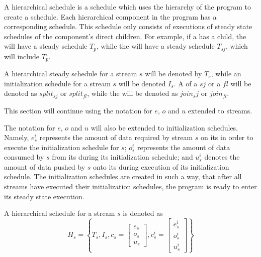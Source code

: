 A hierarchical schedule is a schedule which uses the hierarchy of
the program to create a schedule. Each hierarchical component in
the program has a corresponding schedule. This schedule only
consists of executions of steady state schedules of the
component's direct children. For example, if a \splitjoin has a
\pipeline child, the \pipeline will have a steady schedule $T_p$,
while the \splitjoin will have a steady schedule $T_{sj}$, which
will include $T_p$.

A hierarchical steady schedule for a stream $s$ will be denoted by
$T_s$, while an initialization schedule for a stream $s$ will be
denoted $I_s$. A {\splitter} of a {\splitjoin} $sj$ or a
{\feedbackloop} $fl$ will be denoted as $split_{sj}$ or
$split_{fl}$, while the {\joiner} will be denoted as $join_sj$ or
$join_{fl}$.

This section will continue using the notation for $e$, $o$ and $u$
extended to streams.
\begin{comment}
That is, for a stream $s$,
$e_s$ will represent the amount of data needed by $s$ on its
{\Input} {{\Channel}} in order to execute its minimal steady state
schedule; $o_s$ represents the amount of data consumed by from its
{\Input} {{\Channel}} $s$ during execution of its steady state
schedule; and $u_s$ represents the amount of data pushed by $s$
onto its {\Output} {{\Channel}}.
\end{comment}
The notation for $e$, $o$ and $u$ will also be extended to
initialization schedules.  Namely, $e^i_s$ represents the amount
of data required by stream $s$ on its {\Input} {{\Channel}} in
order to execute the initialization schedule for $s$; $o^i_s$
represents the amount of data consumed by $s$ from its {\Input}
{{\Channel}} during its initialization schedule; and $u^i_s$
denotes the amount of data pushed by $s$ onto its {\Output}
{{\Channel}} during execution of its initialization schedule.  The
initialization schedules are created in such a way, that after all
streams have executed their initialization schedules, the program
is ready to enter its steady state execution.

\begin{comment}
Note, that it is possible that a stream $s$ has $u^i_s \ne
0$. An example of this will be presented in Section
\ref{sec:sas-fl}.
\end{comment}

A hierarchical schedule for a stream $s$ is denoted as $$H_s =
\left\{T_s, I_s, c_s = \left[\begin{array}{c}
e_s\\o_s\\u_s\end{array}\right], c^i_s =
\left[\begin{array}{c}e^i_s\\o^i_s\\u^i_s\end{array}\right]\right\}$$

